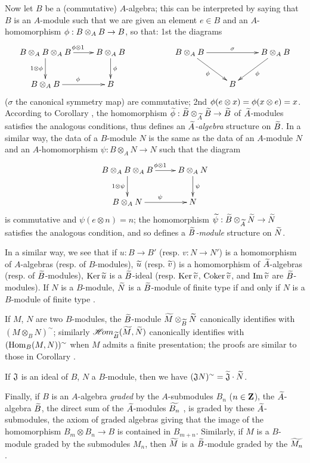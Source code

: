 \begin{env}[1.3.13]
\label{1.1.3.13}
Now let $B$ be a (commutative) $A$-algebra; this can be interpreted by saying that $B$ is an
$A$-module such that we are given an element $e\in B$ and an $A$-homomorphism
$\phi:B\otimes_A B\to B$, so that: 1st the diagrams
\[
  \xymatrix{
    B\otimes_A B\otimes_A B\ar[r]^{\vphi\otimes 1}\ar[d]_{1\otimes\vphi} &
    B\otimes_A B\ar[d]^\vphi & &
    B\otimes_A B\ar[rr]^\sigma\ar[rd]_\vphi & &
    B\otimes_A B\ar[dl]^\vphi\\
    B\otimes_A B\ar[r]^\vphi &
    B & & &
    B
  }
\]
($\sigma$ the canonical symmetry map) are commutative; 2nd
$\phi(e\otimes x)=\phi(x\otimes e)=x$. According to
Corollary , the homomorphism
$\widetilde{\phi}:\widetilde{B}\otimes_{\widetilde{A}}\widetilde{B}\to\widetilde{B}$ of
$\widetilde{A}$-modules satisfies the analogous conditions, thus defines an
\emph{$\widetilde{A}$-algebra} structure on $\widetilde{B}$. In a similar way, the data of
a $B$-module $N$ is the same as the data of an $A$-module $N$ and an $A$-homomorphism
$\psi:B\otimes_A N\to N$ such that the diagram
\[
  \xymatrix{
    B\otimes_A B\otimes_A B\ar[r]^{\vphi\otimes 1}\ar[d]_{1\otimes\psi} &
    B\otimes_A N\ar[d]^\psi\\
    B\otimes_A N\ar[r]^\psi &
    N
  }
\]
is commutative and $\psi(e\otimes n)=n$; the homomorphism
$\widetilde{\psi}:\widetilde{B}\otimes_{\widetilde{A}}\widetilde{N}\to\widetilde{N}$
satisfies the analogous condition, and so defines a \emph{$\widetilde{B}$-module} structure
on $\widetilde{N}$.

In a similar way, we see that if $u:B\to B'$ (resp. $v:N\to N'$) is a homomorphism of
$A$-algebras (resp. of $B$-modules), $\widetilde{u}$ (resp. $\widetilde{v}$) is a
homomorphism of $\widetilde{A}$-algebras (resp. of $\widetilde{B}$-modules),
${\mathop{\mathrm{Ker}}\nolimits}\,\widetilde{u}$ is a $\widetilde{B}$-ideal (resp. ${\mathop{\mathrm{Ker}}\nolimits}\,\widetilde{v}$,
${\mathop{\mathrm{Coker}}\nolimits}\,\widetilde{v}$, and ${\mathop{\mathrm{Im}}\nolimits}\,\widetilde{v}$ are $\widetilde{B}$-modules). If $N$ is a
$B$-module, $\widetilde{N}$ is a $\widetilde{B}$-module of finite type if and only if $N$
is a $B$-module of finite type .

If $M$, $N$ are two $B$-modules, the $\widetilde{B}$-module
$\widetilde{M}\otimes_{\widetilde{B}}\widetilde{N}$ canonically identifies with
$(M\otimes_B N)^\sim$; similarly $\mathscr{H}\!{om}_{\widetilde{B}}(\widetilde{M},\widetilde{N})$
canonically identifies with $({\mathop{\mathrm{Hom}}\nolimits}_B(M,N))^\sim$ when $M$ admits a finite presentation; the
proofs are similar to those in Corollary .

If $\mathfrak{J}$ is an ideal of $B$, $N$ a $B$-module, then we have
$(\mathfrak{J}N)^\sim=\widetilde{\mathfrak{J}}\cdot\widetilde{N}$.

Finally, if $B$ is an $A$-algebra \emph{graded} by the $A$-submodules $B_n$ ($n\in\mathbf{Z}$),
the $\widetilde{A}$-algebra $\widetilde{B}$, the direct sum of the $\widetilde{A}$-modules
$\widetilde{B_n}$ , is graded by these $\widetilde{A}$-submodules, the axiom
of graded algebras giving that the image of the homomorphism $B_m\otimes B_n\to B$ is
contained in $B_{m+n}$. Similarly, if $M$ is a $B$-module graded by the submodules $M_n$,
then $\widetilde{M}$ is a $\widetilde{B}$-module graded by the $\widetilde{M_n}$.
\end{env}

